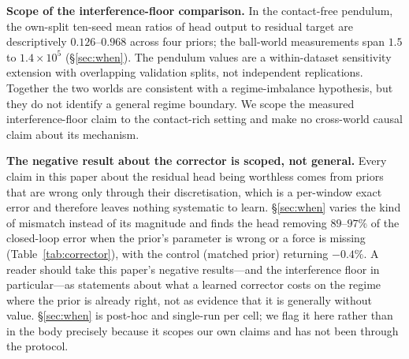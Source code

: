 \documentclass{article}
\begin{document}
\textbf{Scope of the interference-floor comparison.} In the contact-free pendulum, the own-split ten-seed mean ratios of head output to residual target are descriptively $0.126$--$0.968$ across four priors; the ball-world measurements span $1.5$ to $1.4\times10^{5}$ (\S\ref{sec:when}). The pendulum values are a within-dataset sensitivity extension with overlapping validation splits, not independent replications. Together the two worlds are consistent with a regime-imbalance hypothesis, but they do not identify a general regime boundary. We scope the measured interference-floor claim to the contact-rich setting and make no cross-world causal claim about its mechanism.

\textbf{The negative result about the corrector is scoped, not general.} Every claim in
this paper about the residual head being worthless comes from priors that are wrong only
through their discretisation, which is a per-window exact error and therefore leaves
nothing systematic to learn. \S\ref{sec:when} varies the kind of mismatch
instead of its magnitude and finds the head removing $89$--$97\%$ of the closed-loop
error when the prior's parameter is wrong or a force is missing
(Table~\ref{tab:corrector}), with the control
(matched prior) returning $-0.4\%$. A reader should take this paper's negative
results---and the interference floor in particular---as statements about what a learned
corrector costs on the regime where the prior is already right, not as evidence that it
is generally without value. \S\ref{sec:when} is post-hoc and single-run per
cell; we flag it here rather than in the body precisely because it scopes our own claims
and has not been through the protocol.
\end{document}
